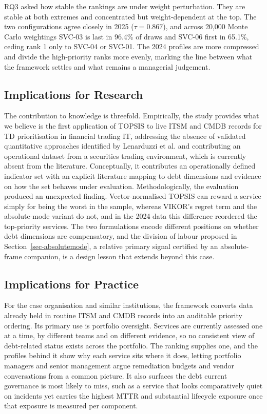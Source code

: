 \documentclass[
  journal,
]{IEEEtran}%
\begin{document}
RQ3 asked how stable the rankings are under weight perturbation. They
are stable at both extremes and concentrated but weight-dependent at the
top. The two configurations agree closely in 2025 (\(\tau = 0.867\)),
and across 20,000 Monte Carlo weightings SVC-03 is last in 96.4\% of
draws and SVC-06 first in 65.1\%, ceding rank 1 only to SVC-04 or
SVC-01. The 2024 profiles are more compressed and divide the
high-priority ranks more evenly, marking the line between what the
framework settles and what remains a managerial judgement.

\subsection{Implications for Research}\label{implications-for-research}

The contribution to knowledge is threefold. Empirically, the study
provides what we believe is the first application of TOPSIS to live ITSM
and CMDB records for TD prioritisation in financial trading IT,
addressing the absence of validated quantitative approaches identified
by Lenarduzzi et al.
 and
contributing an operational dataset from a securities trading
environment, which is currently absent from the literature.
Conceptually, it contributes an operationally defined indicator set with
an explicit literature mapping to debt dimensions and evidence on how
the set behaves under evaluation. Methodologically, the evaluation
produced an unexpected finding. Vector-normalised TOPSIS can reward a
service simply for being the worst in the sample, whereas VIKOR's regret
term and the absolute-mode variant do not, and in the 2024 data this
difference reordered the top-priority services. The two formulations
encode different positions on whether debt dimensions are compensatory,
and the division of labour proposed in Section~\ref{sec-absolutemode}, a
relative primary signal certified by an absolute-frame companion, is a
design lesson that extends beyond this case.

\subsection{Implications for Practice}\label{implications-for-practice}

For the case organisation and similar institutions, the framework
converts data already held in routine ITSM and CMDB records into an
auditable priority ordering. Its primary use is portfolio oversight.
Services are currently assessed one at a time, by different teams and on
different evidence, so no consistent view of debt-related status exists
across the portfolio. The ranking supplies one, and the profiles behind
it show why each service sits where it does, letting portfolio managers
and senior management argue remediation budgets and vendor conversations
from a common picture. It also surfaces the debt current governance is
most likely to miss, such as a service that looks comparatively quiet on
incidents yet carries the highest MTTR and substantial lifecycle
exposure once that exposure is measured per component.
\end{document}

